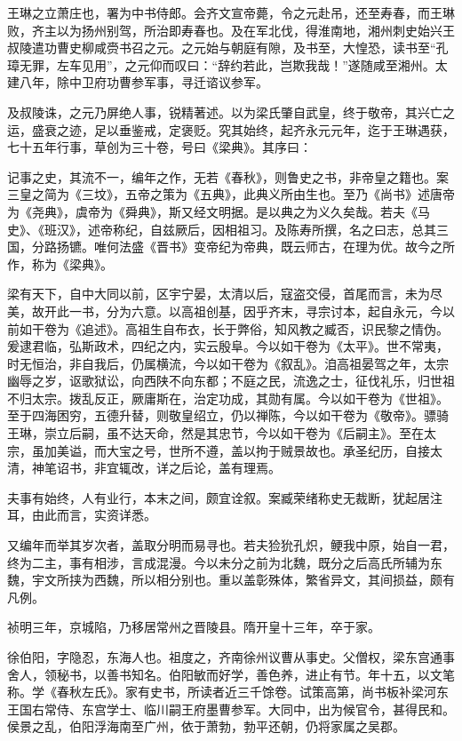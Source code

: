 \documentclass[]{article}
\begin{document}
王琳之立萧庄也，署为中书侍郎。会齐文宣帝薨，令之元赴吊，还至寿春，而王琳败，齐主以为扬州别驾，所治即寿春也。及在军北伐，得淮南地，湘州刺史始兴王叔陵遣功曹史柳咸赍书召之元。之元始与朝庭有隙，及书至，大惶恐，读书至``孔璋无罪，左车见用''，之元仰而叹曰：``辞约若此，岂欺我哉！''遂随咸至湘州。太建八年，除中卫府功曹参军事，寻迁谘议参军。

及叔陵诛，之元乃屏绝人事，锐精著述。以为梁氏肇自武皇，终于敬帝，其兴亡之运，盛衰之迹，足以垂鉴戒，定褒贬。究其始终，起齐永元元年，迄于王琳遇获，七十五年行事，草创为三十卷，号曰《梁典》。其序曰：

记事之史，其流不一，编年之作，无若《春秋》，则鲁史之书，非帝皇之籍也。案三皇之简为《三坟》，五帝之策为《五典》，此典义所由生也。至乃《尚书》述唐帝为《尧典》，虞帝为《舜典》，斯又经文明据。是以典之为义久矣哉。若夫《马史》、《班汉》，述帝称纪，自兹厥后，因相祖习。及陈寿所撰，名之曰志，总其三国，分路扬镳。唯何法盛《晋书》变帝纪为帝典，既云师古，在理为优。故今之所作，称为《梁典》。

梁有天下，自中大同以前，区宇宁晏，太清以后，寇盗交侵，首尾而言，未为尽美，故开此一书，分为六意。以高祖创基，因乎齐末，寻宗讨本，起自永元，今以前如干卷为《追述》。高祖生自布衣，长于弊俗，知风教之臧否，识民黎之情伪。爰逮君临，弘斯政术，四纪之内，实云殷阜。今以如干卷为《太平》。世不常夷，时无恒治，非自我后，仍属横流，今以如干卷为《叙乱》。洎高祖晏驾之年，太宗幽辱之岁，讴歌狱讼，向西陕不向东都；不庭之民，流逸之士，征伐礼乐，归世祖不归太宗。拨乱反正，厥庸斯在，治定功成，其勋有属。今以如干卷为《世祖》。至于四海困穷，五德升替，则敬皇绍立，仍以禅陈，今以如干卷为《敬帝》。骠骑王琳，崇立后嗣，虽不达天命，然是其忠节，今以如干卷为《后嗣主》。至在太宗，虽加美谥，而大宝之号，世所不遵，盖以拘于贼景故也。承圣纪历，自接太清，神笔诏书，非宜辄改，详之后论，盖有理焉。

夫事有始终，人有业行，本末之间，颇宜诠叙。案臧荣绪称史无裁断，犹起居注耳，由此而言，实资详悉。

又编年而举其岁次者，盖取分明而易寻也。若夫猃狁孔炽，鲠我中原，始自一君，终为二主，事有相涉，言成混漫。今以未分之前为北魏，既分之后高氏所辅为东魏，宇文所挟为西魏，所以相分别也。重以盖彰殊体，繁省异文，其间损益，颇有凡例。

祯明三年，京城陷，乃移居常州之晋陵县。隋开皇十三年，卒于家。

徐伯阳，字隐忍，东海人也。祖度之，齐南徐州议曹从事史。父僧权，梁东宫通事舍人，领秘书，以善书知名。伯阳敏而好学，善色养，进止有节。年十五，以文笔称。学《春秋左氏》。家有史书，所读者近三千馀卷。试策高第，尚书板补梁河东王国右常侍、东宫学士、临川嗣王府墨曹参军。大同中，出为候官令，甚得民和。侯景之乱，伯阳浮海南至广州，依于萧勃，勃平还朝，仍将家属之吴郡。
\end{document}
